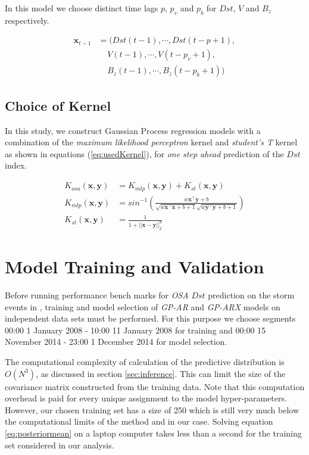 \documentclass[sw, draft]{AGUTeX}
\begin{document}
\begin{article}
In this model we choose distinct time lags $p$, $p_{v}$ and $p_{b}$ for $Dst$, $V$ and $B_z$ respectively.
    
\begin{align*}
       \mathbf{x}_{t-1} & = (Dst(t-1), \cdots , Dst(t-p+1), \\
        & \ \ \ \ \  V(t-1), \cdots, V(t-p_{v}+1),\\
        & \ \ \ \ \  B_{z}(t-1), \cdots, B_{z}(t-p_{b}+1))
\end{align*}

\subsection{Choice of Kernel}

In this study, we construct Gaussian Process regression models with a combination of the \emph{maximum likelihood perceptron} kernel and \emph{student's T} kernel as shown in equations (\ref{eq:usedKernel}), for \emph{one step ahead} prediction of the $Dst$ index.

\begin{align}
    K_{osa}(\mathbf{x}, \mathbf{y}) & = K_{mlp}(\mathbf{x}, \mathbf{y}) + K_{st}(\mathbf{x}, \mathbf{y}) \label{eq:usedKernel} \\
    K_{mlp}(\mathbf{x}, \mathbf{y}) & = sin^{-1}(\frac{w\mathbf{x}^\intercal \mathbf{y} + b}{\sqrt{w\mathbf{x}^\intercal \mathbf{x} + b + 1} \sqrt{w\mathbf{y}^\intercal \mathbf{y} + b + 1}}) \\
    K_{st}(\mathbf{x}, \mathbf{y}) & = \frac{1}{1 + ||\mathbf{x} - \mathbf{y}||_{2}^d}
\end{align}

\section{Model Training and Validation} \label{sec:modeltraining}

Before running performance bench marks for \emph{OSA} $Dst$ prediction on the storm events in \citet{Ji2012}, training and model selection of \emph{GP-AR} and \emph{GP-ARX} models on independent data sets must be performed. For this purpose we choose segments 00:00 1 January 2008 - 10:00 11 January 2008 for training and 00:00 15 November 2014 - 23:00 1 December 2014 for model selection. 

The computational complexity of calculation of the predictive distribution is $O(N^3)$, as discussed in section \ref{sec:inference}. This can limit the size of the covariance matrix constructed from the training data. Note that this computation overhead is paid for every unique assignment to the model hyper-parameters. However, our chosen training set has a size of 250 which is still very much below the computational limits of the method and in our case. Solving equation \ref{eq:posteriormean} on a laptop computer takes less than a second for the training set considered in our analysis. 



\end{article}
\end{document}
